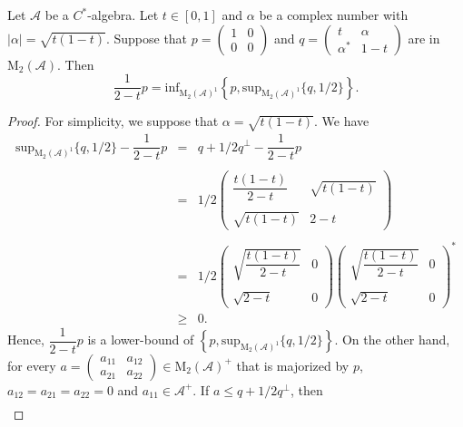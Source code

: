 \documentclass[10pt,a4paper]{amsart}
\begin{document}
\begin{lem}\label{Homo}
Let $\mathcal{A}$ be a $C^*$-algebra. Let $t\in[0,1]$ and $\alpha$ be a complex number with   $|\alpha|=\sqrt{t(1-t)}$. Suppose that $p=\begin{pmatrix}
	1 & 0 \\ 
	0 & 0
\end{pmatrix}$ and $q=\begin{pmatrix}
	t                & \alpha\\
	\alpha^* & 1-t
\end{pmatrix}$ are in $\mathrm{M}_2(\mathcal{A})$. Then $$\frac{1}{2-t}p=\mathrm{inf}_{\mathrm{M}_2(\mathcal{A})^1}\left\lbrace p,\mathrm{sup}_{\mathrm{M}_2(\mathcal{A})^1}\{q,1/2\}\right\rbrace.$$
\end{lem}

\begin{proof}
For simplicity, we suppose that $\alpha=\sqrt{t(1-t)}$.  We have $$\begin{array}{llllllllllllllll}
	\mathrm{sup}_{\mathrm{M}_2(\mathcal{A})^1}\{q,1/2\}-\dfrac{1}{2-t}p &=& q+1/2q^\perp-\dfrac{1}{2-t}p \\
	\\
	&=&1/2 \begin{pmatrix}
		\dfrac{t(1-t)}{2-t} & \sqrt{t(1-t)}\\ \\
		\sqrt{t(1-t)} & 2-t
	\end{pmatrix}\\ \\
	&=& 1/2 \begin{pmatrix}
		\sqrt{\dfrac{t(1-t)}{2-t}} & 0\\ \\
		\sqrt{2-t} &  0
	\end{pmatrix}  \begin{pmatrix}
		\sqrt{\dfrac{t(1-t)}{2-t}} & 0\\ \\
		\sqrt{2-t} &  0
	\end{pmatrix}^* \\ 
	&\geq& 0.
\end{array}$$	
Hence, $\dfrac{1}{2-t}p$ is a lower-bound of $\left\lbrace p,\mathrm{sup}_{\mathrm{M}_2(\mathcal{A})^1}\{q,1/2\}\right\rbrace $. On the other hand, for every  $a=\begin{pmatrix}
	a_{11}&a_{12}\\
	a_{21} & a_{22}
\end{pmatrix}\in \mathrm{M}_2(\mathcal{A})^+$ that is majorized by $p$, $a_{12}=a_{21}=a_{22}=0$ and $a_{11}\in\mathcal{A}^+$. If $a\leq q+1/2q^\perp$, then   $$\begin{array}{llllllll}

\end{array}$$
\end{proof}
\end{document}
